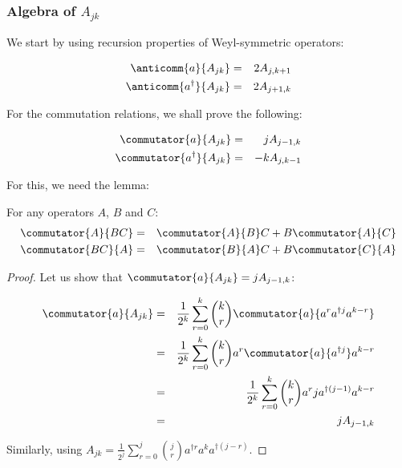 \subsubsection{Algebra of $A_{j k}$}

We start by using recursion properties of Weyl-symmetric operators:

\begin{theorem}
    \begin{eqnarray}
        \anticomm{a}{A_{j k}} &=& 2 A_{j, k+1}\\
        \anticomm{a^\dagger}{A_{j k}} &=& 2 A_{j+1, k}
    \end{eqnarray}
\end{theorem}

For the commutation relations, we shall prove the following:

\begin{theorem}
    \begin{eqnarray}
        \commutator{a}{A_{j k}} &=& j A_{j-1, k}\\
        \commutator{a^\dagger}{A_{j k}} &=& -k A_{j, k-1}
    \end{eqnarray}
\end{theorem}

For this, we need the lemma:

\begin{lemma}
    For any operators $A$, $B$ and $C$:
    \begin{eqnarray}
        \commutator{A}{BC} &=& \commutator{A}{B} C + B \commutator{A}{C} \nonumber\\
        \commutator{BC}{A} &=& \commutator{B}{A} C + B \commutator{C}{A}
    \end{eqnarray}
\end{lemma}

\begin{proof}
    Let us show that $\commutator{a}{A_{j k}} = j A_{j-1, k}$:

    \begin{eqnarray}
        \commutator{a}{A_{j k}} &=& \frac{1}{2^k} \sum_{r=0}^k \binom{k}{r} \commutator{a}{a^r a^{\dagger j} a^{k-r}} \nonumber\\
        &=& \frac{1}{2^k} \sum_{r=0}^k \binom{k}{r} a^r \commutator{a}{a^{\dagger j}} a^{k-r} \nonumber\\
        &=& \frac{1}{2^k} \sum_{r=0}^k \binom{k}{r} a^r j a^{\dagger (j-1)} a^{k-r} \nonumber\\
        &=& j A_{j-1, k}
    \end{eqnarray}

    Similarly, using $A_{j k} = \frac{1}{2^j} \sum_{r=0}^j \binom{j}{r} a^{\dagger r} a^{k} a^{\dagger (j-r)}$.
\end{proof}

